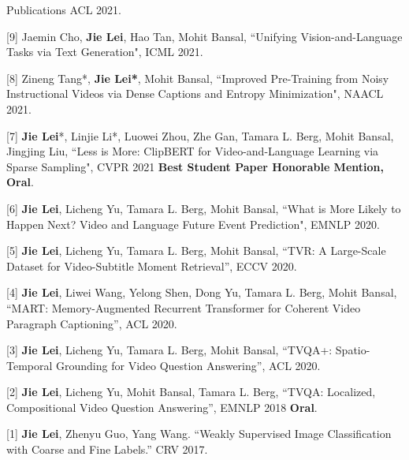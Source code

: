\documentclass{resume} %
\begin{document}
\begin{rSection}{Publications}
{            ACL 2021.
            }        
    \item {[9] Jaemin Cho, \textbf{Jie Lei}, Hao Tan, Mohit Bansal,
            ``Unifying Vision-and-Language Tasks via Text Generation",
            ICML 2021.    
            }       
    \item {[8] Zineng Tang*, \textbf{Jie Lei*}, Mohit Bansal,
            ``Improved Pre-Training from Noisy Instructional Videos via Dense Captions and Entropy Minimization",
            NAACL 2021.  
            }               
    \item {[7] \textbf{Jie Lei}*, Linjie Li*, Luowei Zhou, Zhe Gan, Tamara L. Berg, Mohit Bansal, Jingjing Liu,
            ``Less is More: ClipBERT for Video-and-Language Learning via Sparse Sampling",
            CVPR 2021 {\color{bittersweet}\textbf{Best Student Paper Honorable Mention, Oral}}.    
            }                  
    \item {[6] \textbf{Jie Lei}, Licheng Yu, Tamara L. Berg, Mohit Bansal,
            ``What is More Likely to Happen Next? Video and Language Future Event Prediction",
            EMNLP 2020.    
            }    
   \item {[5] \textbf{Jie Lei}, Licheng Yu, Tamara L. Berg, Mohit Bansal,
        ``TVR: A Large-Scale Dataset for Video-Subtitle Moment Retrieval'',
            ECCV 2020. 
            } 
   \item {[4] \textbf{Jie Lei}, Liwei Wang, Yelong Shen, Dong Yu, Tamara L. Berg, Mohit Bansal,
         ``MART: Memory-Augmented Recurrent Transformer for Coherent Video Paragraph Captioning'',
         ACL 2020.
         }               
   \item {[3] \textbf{Jie Lei}, Licheng Yu, Tamara L. Berg, Mohit Bansal,
               ``TVQA+: Spatio-Temporal Grounding for Video Question Answering'',
               ACL 2020.
               }
    \item {[2] \textbf{Jie Lei}, Licheng Yu, Mohit Bansal, Tamara L. Berg, 
               ``TVQA: Localized, Compositional Video Question Answering'',
               EMNLP 2018 {\color{bittersweet}\textbf{Oral}}.
               }
    \item {[1] \textbf{Jie Lei}, Zhenyu Guo, Yang Wang.
                ``Weakly Supervised Image Classification with Coarse and Fine Labels.''
                CRV 2017.
                }
\end{rSection}

\end{document}
